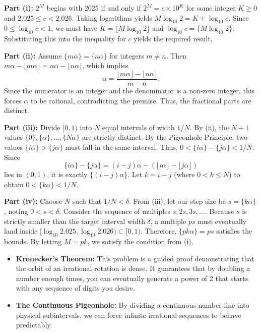 \begin{solution}
\textbf{Part (i):} $2^M$ begins with 2025 if and only if $2^M = c \times 10^K$ for some integer $K \ge 0$ and $2.025 \le c < 2.026$. Taking logarithms yields $M \log_{10} 2 = K + \log_{10} c$. Since $0 \le \log_{10} c < 1$, we must have $K = \lfloor M \log_{10} 2 \rfloor$ and $\log_{10} c = \{M \log_{10} 2\}$. Substituting this into the inequality for $c$ yields the required result.

\vspace{0.2cm}
\textbf{Part (ii):} Assume $\{m\alpha\} = \{n\alpha\}$ for integers $m \ne n$. Then $m\alpha - \lfloor m\alpha \rfloor = n\alpha - \lfloor n\alpha \rfloor$, which implies
\[
\alpha = \frac{\lfloor m\alpha \rfloor - \lfloor n\alpha \rfloor}{m - n}.
\]
Since the numerator is an integer and the denominator is a non-zero integer, this forces $\alpha$ to be rational, contradicting the premise. Thus, the fractional parts are distinct.

\vspace{0.2cm}
\textbf{Part (iii):} Divide $[0,1)$ into $N$ equal intervals of width $1/N$. By (ii), the $N+1$ values $\{0\}, \{\alpha\}, \dots, \{N\alpha\}$ are strictly distinct. By the Pigeonhole Principle, two values $\{i\alpha\} > \{j\alpha\}$ must fall in the same interval. Thus, $0 < \{i\alpha\} - \{j\alpha\} < 1/N$. Since
\[
\{i\alpha\} - \{j\alpha\} = (i-j)\alpha - (\lfloor i\alpha \rfloor - \lfloor j\alpha \rfloor)
\]
lies in $(0,1)$, it is exactly $\{(i-j)\alpha\}$. Let $k = i-j$ (where $0 < k \le N$) to obtain $0 < \{k\alpha\} < 1/N$.

\vspace{0.2cm}
\textbf{Part (iv):} Choose $N$ such that $1/N < \delta$. From (iii), let our step size be $s = \{k\alpha\}$, noting $0 < s < \delta$. Consider the sequence of multiples $s, 2s, 3s, \dots$. Because $s$ is strictly smaller than the target interval width $\delta$, a multiple $ps$ must eventually land inside $[\log_{10} 2.025, \log_{10} 2.026) \subset [0,1)$. Therefore, $\{pk\alpha\} = ps$ satisfies the bounds. By letting $M = pk$, we satisfy the condition from (i).

\vspace{0.3cm}

\end{solution}

\begin{takeaways}
\begin{itemize}
    \item \textbf{Kronecker's Theorem:} This problem is a guided proof demonstrating that the orbit of an irrational rotation is dense. It guarantees that by doubling a number enough times, you can eventually generate a power of 2 that starts with any sequence of digits you desire.
    \item \textbf{The Continuous Pigeonhole:} By dividing a continuous number line into physical subintervals, we can force infinite irrational sequences to behave predictably.
\end{itemize}
\end{takeaways}
